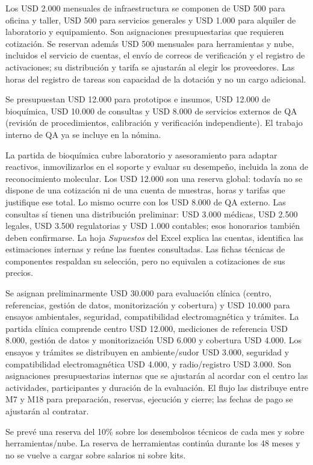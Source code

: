 Los USD 2.000 mensuales de infraestructura se componen de USD 500 para oficina y taller, USD 500 para servicios generales y USD 1.000 para alquiler de laboratorio y equipamiento. Son asignaciones presupuestarias que requieren cotización. Se reservan además USD 500 mensuales para herramientas y nube, incluidos el servicio de cuentas, el envío de correos de verificación y el registro de activaciones; su distribución y tarifa se ajustarán al elegir los proveedores. Las horas del registro de tareas son capacidad de la dotación y no un cargo adicional.

Se presupuestan USD 12.000 para prototipos e insumos, USD 12.000 de bioquímica, USD 10.000 de consultas y USD 8.000 de servicios externos de QA (revisión de procedimientos, calibración y verificación independiente). El trabajo interno de QA ya se incluye en la nómina.

La partida de bioquímica cubre laboratorio y asesoramiento para adaptar reactivos, inmovilizarlos en el soporte y evaluar su desempeño, incluida la zona de reconocimiento molecular. Los USD 12.000 son una reserva global: todavía no se dispone de una cotización ni de una cuenta de muestras, horas y tarifas que justifique ese total. Lo mismo ocurre con los USD 8.000 de QA externo. Las consultas sí tienen una distribución preliminar: USD 3.000 médicas, USD 2.500 legales, USD 3.500 regulatorias y USD 1.000 contables; esos honorarios también deben confirmarse. La hoja \textit{Supuestos} del Excel explica las cuentas, identifica las estimaciones internas y reúne las fuentes consultadas. Las fichas técnicas de componentes respaldan su selección, pero no equivalen a cotizaciones de sus precios.

Se asignan preliminarmente USD 30.000 para evaluación clínica (centro, referencias, gestión de datos, monitorización y cobertura) y USD 10.000 para ensayos ambientales, seguridad, compatibilidad electromagnética y trámites. La partida clínica comprende centro USD 12.000, mediciones de referencia USD 8.000, gestión de datos y monitorización USD 6.000 y cobertura USD 4.000. Los ensayos y trámites se distribuyen en ambiente/sudor USD 3.000, seguridad y compatibilidad electromagnética USD 4.000, y radio/registro USD 3.000. Son asignaciones presupuestarias internas que se ajustarán al acordar con el centro las actividades, participantes y duración de la evaluación. El flujo las distribuye entre M7 y M18 para preparación, reservas, ejecución y cierre; las fechas de pago se ajustarán al contratar.

Se prevé una reserva del 10\% sobre los desembolsos técnicos de cada mes y sobre herramientas/nube. La reserva de herramientas continúa durante los 48 meses y no se vuelve a cargar sobre salarios ni sobre kits.

